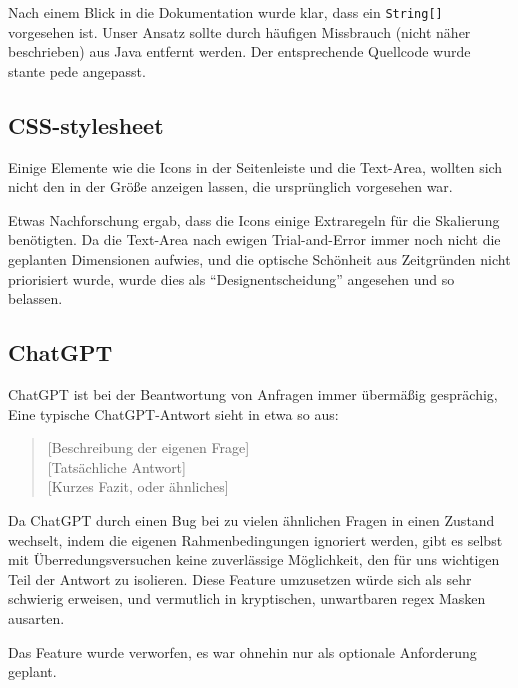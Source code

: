 \documentclass[stu, a4paper, 11pt, floatsintext]{apa7}
\begin{document}
Nach einem Blick in die Dokumentation wurde klar, dass ein \texttt{String[]} vorgesehen ist.
Unser Ansatz sollte durch häufigen Missbrauch (nicht näher beschrieben) aus Java entfernt werden.
Der entsprechende Quellcode wurde stante pede angepasst.

\subsection{CSS-stylesheet}

\noindent Einige Elemente wie die Icons in der Seitenleiste und die Text-Area,
wollten sich nicht den in der Größe anzeigen lassen, die ursprünglich vorgesehen war.

Etwas Nachforschung ergab, dass die Icons einige Extraregeln für die Skalierung benötigten.
Da die Text-Area nach ewigen Trial-and-Error immer noch nicht die geplanten Dimensionen aufwies,
und die optische Schönheit aus Zeitgründen nicht priorisiert wurde, wurde dies als ``Designentscheidung'' angesehen und so belassen.

\subsection{ChatGPT}

\noindent ChatGPT ist bei der Beantwortung von Anfragen immer übermäßig gesprächig,
Eine typische ChatGPT-Antwort sieht in etwa so aus:

\begin{quote}
[Beschreibung der eigenen Frage] \\[0pt]
[Tatsächliche Antwort] \\[0pt]
[Kurzes Fazit, oder ähnliches] \\[0pt]
\end{quote}

\noindent Da ChatGPT durch einen Bug bei zu vielen ähnlichen Fragen in einen Zustand wechselt, indem die eigenen Rahmenbedingungen ignoriert werden, gibt es selbst mit Überredungsversuchen keine zuverlässige Möglichkeit, den für uns wichtigen Teil der Antwort zu isolieren.
Diese Feature umzusetzen würde sich als sehr schwierig erweisen, und vermutlich in kryptischen, unwartbaren regex Masken ausarten.

Das Feature wurde verworfen, es war ohnehin nur als optionale Anforderung geplant.
\end{document}
